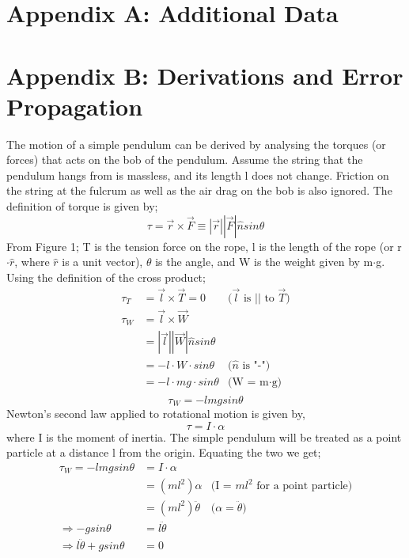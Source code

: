 \documentclass[iop]{emulateapj}
\begin{document}

\appendix
{}
\section{Appendix A: Additional Data}


\appendix
{}
\section{Appendix B: Derivations and Error Propagation}


The motion of a simple pendulum can be derived by analysing the torques (or forces) that acts 
on the bob of the pendulum. Assume the string that the pendulum hangs from is massless, and
its length l does not change. Friction on the string at the fulcrum as well as the
air drag on the bob is also ignored. The definition of torque is given by;
\begin{equation}
\boxed{\tau = \vec{r} \times \vec{F} \equiv |\vec{r}||\vec{F}|\hat{n}sin\theta}
\end{equation}
From Figure 1; T is the tension force on the rope, l is the length of the
rope (or r$\cdot\hat{r}$, where $\hat{r}$ is a unit vector), $\theta$ is the angle, and W is the weight given by m$\cdot$g.
Using the definition of the cross product;
\begin{align*}
\tau_T & = \vec{l} \times \vec{T} = 0 & \text{($\vec{l}$ is $||$ to $\vec{T}$)}\\
\tau_W & = \vec{l} \times \vec{W}\\
& = |\vec{l}||\vec{W}|\hat{n}sin\theta\\
& = -l\cdot W\cdot sin\theta & \text{($\hat{n}$ is "-")}\\
& = -l\cdot mg\cdot sin\theta & \text{(W = m$\cdot$g)}\\
\end{align*}
\begin{equation}
\boxed{\tau_W = -lmgsin\theta}
\end{equation}
Newton's second law applied to rotational motion is given by,
\begin{equation}
\tau = I\cdot\alpha
\end{equation}
where I is the moment of inertia. The simple pendulum will be 
treated as a point particle at a distance l from the origin.
Equating the two we get;
\begin{align*}
\tau_W = -lmgsin\theta & = I\cdot\alpha\\
& = (ml^2)\alpha & \text{(I = $ml^2$ for a point particle)}\\
& = (ml^2)\ddot{\theta} & \text{($\alpha = \ddot{\theta}$)}\\
\Rightarrow -gsin\theta & = l\ddot{\theta}\\
\Rightarrow l\ddot{\theta} + gsin\theta & = 0
\end{align*}
\end{document}
